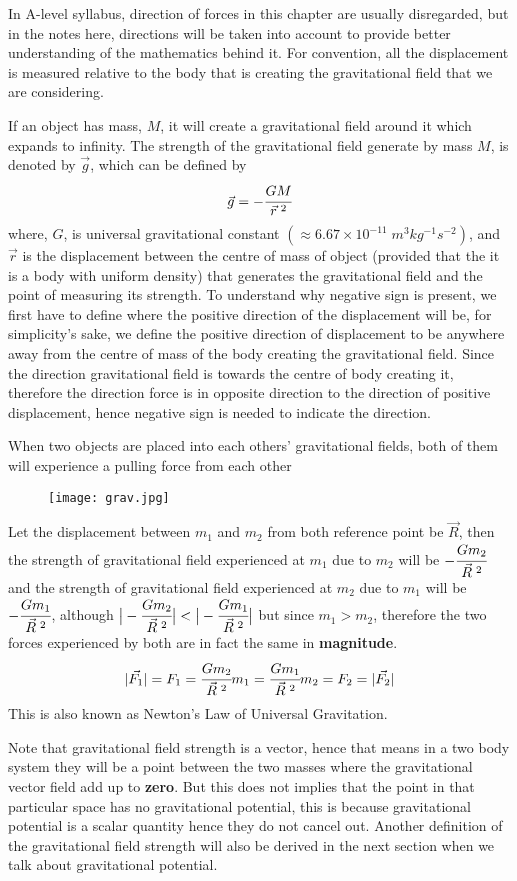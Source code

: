 \documentclass{article}
\begin{document}
In A-level syllabus, direction of forces in this chapter are usually disregarded, but in the notes here, directions will be taken into account to provide better understanding of the mathematics behind it. For convention, all the displacement is measured relative to the body that is creating the gravitational field that we are considering. 

If an object has mass, $M$, it will create a gravitational field around it which expands to infinity. The strength of the gravitational field generate by mass $M$, is denoted by $\vec{g}$, which can be defined by
$$\vec{g}=-\cfrac{GM}{\vec{r}\;^2}$$
where, $G$, is universal gravitational constant $(\approx6.67\times 10^{-11}\; m^3kg^{-1}s^{-2})$, and $\vec{r}$ is the displacement between the centre of mass of object (provided that the it is a body with uniform density) that generates the gravitational field and the point of measuring its strength. To understand why negative sign is present, we first have to define where the positive direction of the displacement will be, for simplicity's sake, we define the positive direction of displacement to be anywhere away from the centre of mass of the body creating the gravitational field. Since  the direction gravitational field is towards the centre of body creating it, therefore the direction force is in opposite direction to the direction of positive displacement, hence negative sign is needed to indicate the direction.

When two objects are placed into each others' gravitational fields, both of them will experience a pulling force from each other

\begin{figure}[H]
    \centering
    \texttt{[image: grav.jpg]}
\end{figure}
Let the displacement between $m_1$ and $m_2$ from both reference point be $\vec{R}$, then the strength of gravitational field experienced at $m_1$ due to $m_2$ will be $-\cfrac{Gm_2}{\vec{R}\;^2}$ and the strength of gravitational field experienced at $m_2$ due to $m_1$ will be $-\cfrac{Gm_1}{\vec{R}\;^2}$, although $\big|-\cfrac{Gm_2}{\vec{R}\;^2}\big|<\big|-\cfrac{Gm_1}{\vec{R}\;^2}\big|$ but since $m_1>m_2$, therefore the two forces experienced by both are in fact the same in \textbf{magnitude}.
$$|\vec{F_1}|=F_1=\cfrac{Gm_2}{\vec{R}\;^2}m_1=\cfrac{Gm_1}{\vec{R}\;^2}m_2=F_2=|\vec{F_2}|$$
This is also known as Newton's Law of Universal Gravitation.

Note that gravitational field strength is a vector, hence that means in a two body system they will be a point between the two masses where the gravitational vector field add up to \textbf{zero}. But this does not implies that the point in that particular space has no gravitational potential, this is because gravitational potential is a scalar quantity hence they do not cancel out. Another definition of the gravitational field strength will also be derived in the next section when we talk about gravitational potential.
\end{document}
